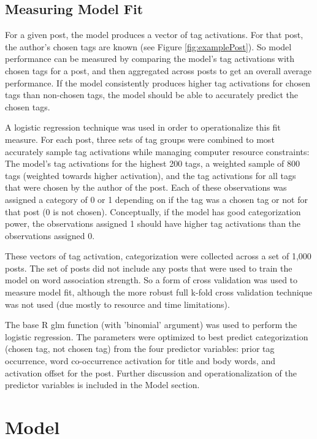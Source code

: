 \documentclass[10pt,letterpaper]{article}
\begin{document}
\subsection{Measuring Model Fit}

For a given post, the model produces a vector of tag activations.
For that post, the author's chosen tags are known (see Figure \ref{fig:examplePost}).
So model performance can be measured by comparing the model's tag activations with chosen tags for a post, and then aggregated across posts to get an overall average performance.
If the model consistently produces higher tag activations for chosen tags than non-chosen tags, the model should be able to accurately predict the chosen tags.

A logistic regression technique was used in order to operationalize this fit measure.
For each post, three sets of tag groups were combined to most accurately sample tag activations while managing computer resource constraints:
The model's tag activations for the highest 200 tags, a weighted sample of 800 tags (weighted towards higher activation), and the tag activations for all tags that were chosen by the author of the post.
Each of these observations was assigned a category of 0 or 1 depending on if the tag was a chosen tag or not for that post (0 is not chosen).
Conceptually, if the model has good categorization power, the observations assigned 1 should have higher tag activations than the observations assigned 0.

These vectors of tag activation, categorization were collected across a set of 1,000 posts.
The set of posts did not include any posts that were used to train the model on word association strength.
So a form of cross validation was used to measure model fit, although the more robust full k-fold cross validation technique was not used (due mostly to resource and time limitations).

The base R glm function (with 'binomial' argument) was used to perform the logistic regression.
The parameters were optimized to best predict categorization (chosen tag, not chosen tag) from the four predictor variables:
prior tag occurrence, word co-occurrence activation for title and body words, and activation offset for the post.
Further discussion and operationalization of the predictor variables is included in the Model section.

\section{Model}
\end{document}
